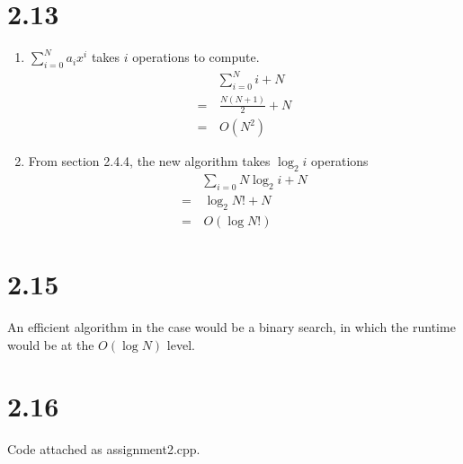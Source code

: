 \documentclass{article}
\begin{document}
\section*{2.13}
    \begin{enumerate}
        \item
            \( \sum_{i=0}^{N} a_{i}x^i \) takes \(i\) operations to compute.
            \begin{equation*} 
            \begin{split}
                & \sum_{i=0}^{N} i + N\\
                = &\, \frac{N(N + 1)}{2} + N\\
                = &\, O(N^2)
            \end{split}
            \end{equation*}
        \item 
            From section 2.4.4, the new algorithm takes \( \log_2{i} \) operations
            \begin{equation*}
            \begin{split}
                & \sum_{i=0}{N} {\log_2{i}} + N\\
                = &\, \log_2{N!} + N\\
                = &\, O(\log{N!})
            \end{split}
            \end{equation*}
    \end{enumerate}
    
\section*{2.15}
    An efficient algorithm in the case would be a binary search, in which the runtime would be at the \( O(\log{N}) \) level.
    
\section*{2.16}
    Code attached as assignment2.cpp.
\end{document}
